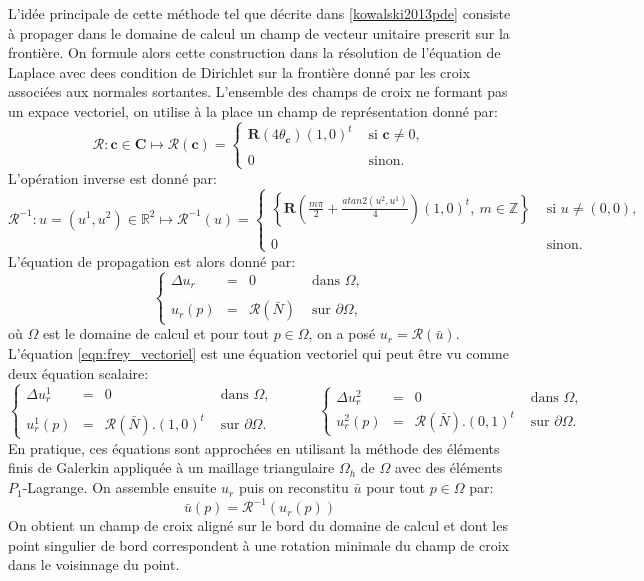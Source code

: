 L'idée principale de cette méthode tel que décrite dans \ref{kowalski2013pde} consiste à propager dans le domaine de calcul un champ de vecteur unitaire prescrit sur la frontière. On formule alors cette construction dans la résolution de l'équation de Laplace avec dees condition de Dirichlet sur la frontière donné par les croix associées aux normales sortantes. L'ensemble des champs de croix ne formant pas un expace vectoriel, on utilise à la place un champ de représentation donné par:
$$
\mathcal{R}: \mathbf{c}\in\mathbf{C}\mapsto\mathcal{R}(\mathbf{c})=
\left\{
\begin{array}{ll}
\mathbf{R}(4\theta_{\mathbf{c}})(1, 0)^t& \mbox{ si }\mathbf{c}\neq 0,\\\\
0&\mbox{ sinon}.
\end{array}
\right.
$$
L'opération inverse est donné par:
$$
\mathcal{R}^{-1}: u=(u^1, u^2)\in\mathbb{R}^2\mapsto\mathcal{R}^{-1}(u)=
\left\{
\begin{array}{ll}
\displaystyle\left\{\mathbf{R}\left(\frac{m\pi}{2}+\frac{atan2(u^2, u^1)}{4}\right)(1, 0)^t,~ m\in \mathbb{Z}\right\} &\mbox{ si }u\neq (0,0),\\\\
0&\mbox{ sinon}.
\end{array}
\right.
$$
L'équation de propagation est alors donné par:
\begin{equation}
\left\{
\begin{array}{lcll}
\Delta u_r &=& 0 &\mbox{ dans }\Omega,\\\\
u_r(p)&=&\mathcal{R}(\bar{N}) & \mbox{ sur } \partial\Omega,
\end{array}
\right.
\label{eqn:frey_vectoriel}
\end{equation}
où $\Omega$ est le domaine de calcul et pour tout $p\in\Omega$, on a posé $u_r=\mathcal{R}(\bar{u})$. L'équation \eqref{eqn:frey_vectoriel} est une équation vectoriel qui peut être vu comme deux équation scalaire:
$$
\left\{
\begin{array}{lcll}
\Delta u_r^1 &=& 0 &\mbox{ dans }\Omega,\\\\
u_r^1(p)&=&\mathcal{R}(\bar{N}).(1, 0)^t & \mbox{ sur } \partial\Omega.
\end{array}
\right.
\quad\quad\quad
\left\{
\begin{array}{lcll}
\Delta u_r^2 &=& 0 &\mbox{ dans }\Omega,\\[0.5cm]
u_r^2(p)&=&\mathcal{R}(\bar{N}).(0, 1)^t & \mbox{ sur } \partial\Omega.
\end{array}
\right.
$$
En pratique, ces équations sont approchées en utilisant la méthode des éléments finis de Galerkin appliquée à un maillage triangulaire $\Omega_h$ de $\Omega$ avec des éléments $P_1$-Lagrange. On assemble ensuite $u_r$ puis on reconstitu $\bar{u}$ pour tout $p\in\Omega$ par:
$$
\bar{u}(p)=\mathcal{R}^{-1}(u_r(p))
$$
On obtient un champ de croix aligné sur le bord du domaine de calcul et dont les point singulier de bord correspondent à une rotation minimale du champ de croix dans le voisinnage du point.


